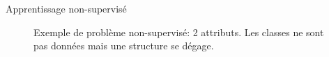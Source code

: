 \documentclass[8pt]{beamer}
\begin{document}
			\begin{frame}{Apprentissage non-supervisé}
				\begin{figure}[H]
					\begin{center}
						
						\caption*{\tiny Exemple de problème non-supervisé: 2 attributs. Les classes ne sont pas données mais une structure se dégage.}
					\end{center}
				\end{figure}
			\end{frame}

\end{document}
